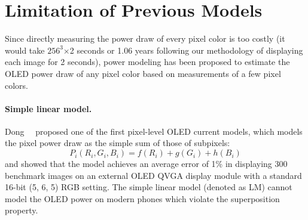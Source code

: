 \section{Limitation of Previous Models}
\label{sec:non_linear}

Since directly measuring the power draw of every pixel color is too
costly (\eg it would take $256^3$$\times$2 seconds or 1.06 years following
our methodology of displaying each image for 2 seconds), power modeling has been proposed to estimate the OLED
power draw of any pixel color based on measurements of a few pixel colors.



\paragraph{Simple linear model.}
\label{subsec:LM}
Dong~\etal~\cite{dong2009current} proposed one of the first pixel-level OLED current models,
which models the pixel power draw as the simple sum of
those of subpixels:
\begin{equation}
	P_i(R_i, G_i,B_i) = f(R_{i}) + g(G_{i}) + h(B_{i})
	\label{eq:linear_equation}
\end{equation}
and showed that the model  achieves an average 
error of 1\% in
displaying 300 benchmark images on an external OLED QVGA display
module with a standard 16-bit (5, 6, 5) RGB setting.
%
The simple linear model (denoted as LM) cannot model the OLED power on modern phones
which violate the superposition property.



